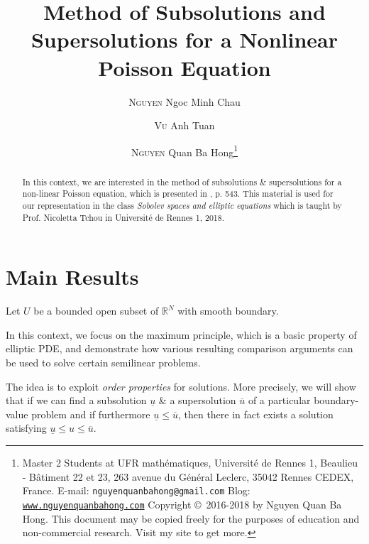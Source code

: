 \documentclass[11pt,a4paper,center,notitlepage]{article}
\title{Method of Subsolutions and Supersolutions for a Nonlinear Poisson Equation}
\author{\textsc{Nguyen} Ngoc Minh Chau \and \textsc{Vu} Anh Tuan \and \textsc{Nguyen} Quan Ba Hong\footnote{Master 2 Students at UFR math\'ematiques, Universit\'e de Rennes 1, Beaulieu - B\^atiment 22 et 23, 263 avenue du G\'en\'eral Leclerc, 35042 Rennes CEDEX, France.\newline
E-mail: \texttt{nguyenquanbahong@gmail.com} \newline
Blog: \texttt{\url{www.nguyenquanbahong.com}} \newline 
Copyright \copyright\ 2016-2018 by Nguyen Quan Ba Hong. This document may be copied freely for the purposes of education and non-commercial research. Visit my site to get more.}}
\numberwithin{equation}{section}
\begin{document}
\maketitle
\begin{abstract}
In this context, we are interested in the method of subsolutions \& supersolutions for a non-linear Poisson equation, which is presented in \cite{1}, p. 543. This material is used for our representation in the class \textit{Sobolev spaces and elliptic equations} which is taught by Prof. Nicoletta Tchou in Universit\'e de Rennes 1, 2018.
\end{abstract}
%
\newpage
\tableofcontents
\newpage
\section{Main Results}
Let $U$ be a bounded open subset of $\mathbb{R}^N$ with smooth boundary.

In this context, we focus on the maximum principle, which is a basic property of elliptic PDE, and demonstrate how various resulting comparison arguments can be used to solve certain semilinear problems.

The idea is to exploit \textit{order properties} for solutions. More precisely, we will show that if we can find a subsolution $\underline u$ \& a supersolution $\overline u$ of a particular boundary-value problem and if furthermore $\underline{u} \le \overline{u}$, then there in fact exists a solution satisfying $\underline u  \le u \le \overline u $. 
\end{document}
